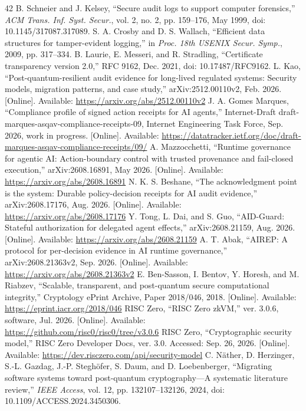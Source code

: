 \begin{thebibliography}{42}
B. Schneier and J. Kelsey, ``Secure audit logs to support computer forensics,'' \emph{ACM Trans. Inf. Syst. Secur.}, vol. 2, no. 2, pp. 159--176, May 1999, doi: 10.1145/317087.317089.
S. A. Crosby and D. S. Wallach, ``Efficient data structures for tamper-evident logging,'' in \emph{Proc. 18th USENIX Secur. Symp.}, 2009, pp. 317--334.
B. Laurie, E. Messeri, and R. Stradling, ``Certificate transparency version 2.0,'' RFC 9162, Dec. 2021, doi: 10.17487/RFC9162.
L. Kao, ``Post-quantum-resilient audit evidence for long-lived regulated systems: Security models, migration patterns, and case study,'' arXiv:2512.00110v2, Feb. 2026. [Online]. Available: \url{https://arxiv.org/abs/2512.00110v2}
J. A. Gomes Marques, ``Compliance profile of signed action receipts for AI agents,'' Internet-Draft draft-marques-asqav-compliance-receipts-09, Internet Engineering Task Force, Sep. 2026, work in progress. [Online]. Available: \url{https://datatracker.ietf.org/doc/draft-marques-asqav-compliance-receipts/09/}
A. Mazzocchetti, ``Runtime governance for agentic AI: Action-boundary control with trusted provenance and fail-closed execution,'' arXiv:2608.16891, May 2026. [Online]. Available: \url{https://arxiv.org/abs/2608.16891}
N. K. S. Beshane, ``The acknowledgment point is the system: Durable policy-decision receipts for AI audit evidence,'' arXiv:2608.17176, Aug. 2026. [Online]. Available: \url{https://arxiv.org/abs/2608.17176}
Y. Tong, L. Dai, and S. Guo, ``AID-Guard: Stateful authorization for delegated agent effects,'' arXiv:2608.21159, Aug. 2026. [Online]. Available: \url{https://arxiv.org/abs/2608.21159}
A. T. Abak, ``AIREP: A protocol for per-decision evidence in AI runtime governance,'' arXiv:2608.21363v2, Sep. 2026. [Online]. Available: \url{https://arxiv.org/abs/2608.21363v2}
E. Ben-Sasson, I. Bentov, Y. Horesh, and M. Riabzev, ``Scalable, transparent, and post-quantum secure computational integrity,'' Cryptology ePrint Archive, Paper 2018/046, 2018. [Online]. Available: \url{https://eprint.iacr.org/2018/046}
RISC Zero, ``RISC Zero zkVM,'' ver. 3.0.6, software, Jul. 2026. [Online]. Available: \url{https://github.com/risc0/risc0/tree/v3.0.6}
RISC Zero, ``Cryptographic security model,'' RISC Zero Developer Docs, ver. 3.0. Accessed: Sep. 26, 2026. [Online]. Available: \url{https://dev.risczero.com/api/security-model}
C. N\"ather, D. Herzinger, S.-L. Gazdag, J.-P. Stegh\"ofer, S. Daum, and D. Loebenberger, ``Migrating software systems toward post-quantum cryptography---A systematic literature review,'' \emph{IEEE Access}, vol. 12, pp. 132107--132126, 2024, doi: 10.1109/ACCESS.2024.3450306.

\end{thebibliography}
